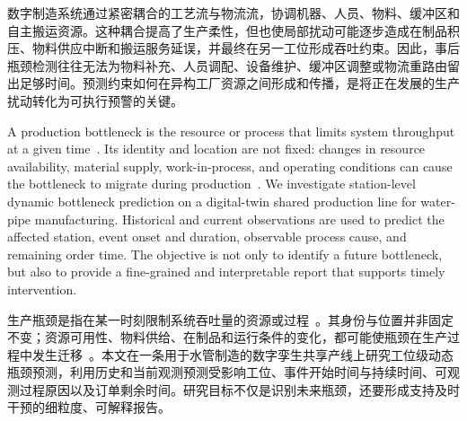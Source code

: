\documentclass[a4paper,fleqn]{cas-dc}
\newcommand{\zhpara}[1]{%
  \par\begingroup\small\color{black!72}\noindent #1\par\endgroup}
\begin{document}
\zhpara{数字制造系统通过紧密耦合的工艺流与物流流，协调机器、人员、物料、缓冲区和自主搬运资源。这种耦合提高了生产柔性，但也使局部扰动可能逐步造成在制品积压、物料供应中断和搬运服务延误，并最终在另一工位形成吞吐约束。因此，事后瓶颈检测往往无法为物料补充、人员调配、设备维护、缓冲区调整或物流重路由留出足够时间。预测约束如何在异构工厂资源之间形成和传播，是将正在发展的生产扰动转化为可执行预警的关键。}

A production bottleneck is the resource or process that limits system throughput at a given time~\cite{roser2001practical,subramaniyan2023throughput,tang2024comprehensive}. Its identity and location are not fixed: changes in resource availability, material supply, work-in-process, and operating conditions can cause the bottleneck to migrate during production~\cite{roser2002shifting,lai2021data}. We investigate station-level dynamic bottleneck prediction on a digital-twin shared production line for water-pipe manufacturing. Historical and current observations are used to predict the affected station, event onset and duration, observable process cause, and remaining order time. The objective is not only to identify a future bottleneck, but also to provide a fine-grained and interpretable report that supports timely intervention.

\zhpara{生产瓶颈是指在某一时刻限制系统吞吐量的资源或过程~\cite{roser2001practical,subramaniyan2023throughput,tang2024comprehensive}。其身份与位置并非固定不变；资源可用性、物料供给、在制品和运行条件的变化，都可能使瓶颈在生产过程中发生迁移~\cite{roser2002shifting,lai2021data}。本文在一条用于水管制造的数字孪生共享产线上研究工位级动态瓶颈预测，利用历史和当前观测预测受影响工位、事件开始时间与持续时间、可观测过程原因以及订单剩余时间。研究目标不仅是识别未来瓶颈，还要形成支持及时干预的细粒度、可解释报告。}
\end{document}
